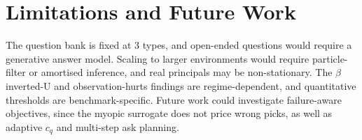\documentclass[10pt,twocolumn]{article}
\begin{document}
\section{Limitations and Future Work}
\label{app:limitations}

The question bank is fixed at 3 types, and open-ended questions would require a generative answer model.
Scaling to larger environments would require particle-filter or amortised inference, and real principals may be non-stationary.
The $\beta$ inverted-U and observation-hurts findings are regime-dependent, and quantitative thresholds are benchmark-specific.
Future work could investigate failure-aware objectives, since the myopic surrogate does not price wrong picks, as well as adaptive $c_q$ and multi-step ask planning.
\end{document}
